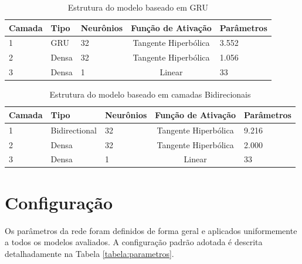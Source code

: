 \begin{table}[h!] \label{tabela:gru_struct}
    \caption{Estrutura do modelo baseado em GRU}
    \begin{tabularx}{\textwidth}{X|X|X|c|X} \hline
    Camada & Tipo & Neurônios & Função de Ativação & Parâmetros \\ \hline
    1      & GRU  & 32  & Tangente Hiperbólica     & 3.552                 \\ \hline
    2      & Densa & 32 & Tangente Hiperbólica     & 1.056                    \\ \hline
    3      & Densa & 1  & Linear                   & 33                     \\ \hline
    \end{tabularx}
\end{table}

\begin{table}[h!] \label{tabela:bidirectional_struct}
    \caption{Estrutura do modelo baseado em camadas Bidirecionais}
    \begin{tabularx}{\textwidth}{X|X|X|c|X} \hline
    Camada & Tipo & Neurônios & Função de Ativação & Parâmetros \\ \hline
    1                   & Bidirectional            & 32                   & Tangente Hiperbólica                         & 9.216                \\ \hline
    2                   & Densa                   &  32               & Tangente Hiperbólica                           & 2.000                 \\ \hline
    3                   & Densa                   &  1                   & Linear                       & 33                     \\ \hline
    \end{tabularx}
\end{table}
    





\section{Configuração} \label{sec:configuracao} 
Os parâmetros da rede foram definidos de forma geral e aplicados uniformemente a todos os modelos avaliados. A configuração padrão adotada é descrita detalhadamente na Tabela \ref{tabela:parametros}.

